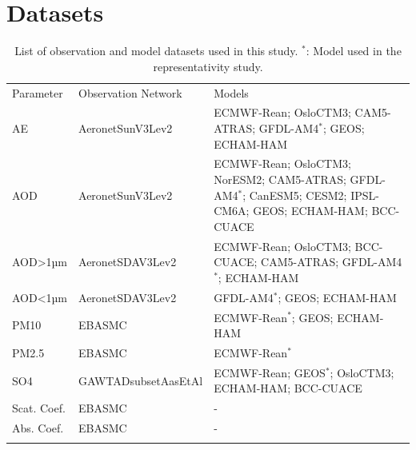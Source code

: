 \documentclass[journal abbreviation, manuscript]{copernicus}
\begin{document}
\section{Datasets}

\begin{table}
 \begin{tabularx}{\textwidth}{llX}
  \tophline
  Parameter   & Observation Network & Models                                                                                                           \\
  \middlehline
  AE          & AeronetSunV3Lev2    & ECMWF-Rean; OsloCTM3; CAM5-ATRAS; GFDL-AM4$^{*}$; GEOS; ECHAM-HAM                                                \\
  AOD         & AeronetSunV3Lev2    & ECMWF-Rean; OsloCTM3; NorESM2; CAM5-ATRAS; GFDL-AM4$^{*}$; CanESM5; CESM2; IPSL-CM6A; GEOS; ECHAM-HAM; BCC-CUACE \\
  AOD>1µm     & AeronetSDAV3Lev2    & ECMWF-Rean; OsloCTM3; BCC-CUACE; CAM5-ATRAS; GFDL-AM4$^{*}$; ECHAM-HAM                                           \\
  AOD<1µm     & AeronetSDAV3Lev2    & GFDL-AM4$^{*}$; GEOS; ECHAM-HAM                                                                                  \\
  PM10        & EBASMC              & ECMWF-Rean$^{*}$; GEOS; ECHAM-HAM                                                                                \\
  PM2.5       & EBASMC              & ECMWF-Rean$^{*}$                                                                                                 \\
  SO4         & GAWTADsubsetAasEtAl & ECMWF-Rean; GEOS$^{*}$; OsloCTM3; ECHAM-HAM; BCC-CUACE                                                           \\
  Scat. Coef. & EBASMC              & -                                                                                                                \\
  Abs. Coef.  & EBASMC              & -                                                                                                                \\
  \bottomhline
 \end{tabularx}
 \caption{List of observation and model datasets used in this study. $^{*}$: Model used in the representativity study.}
 \label{datasets}
\end{table}
\end{document}
